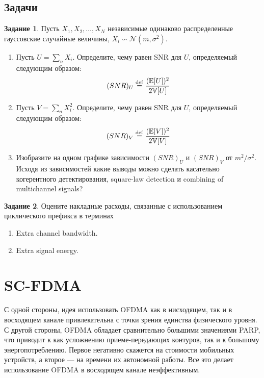 \documentclass{book}
\numberwithin{theorem}{chapter}
\numberwithin{statement}{chapter}
\numberwithin{lemma}{chapter}
\theoremstyle{definition}
\newtheorem{task}{Задание}
\numberwithin{task}{chapter}
\theoremstyle{remark}
\numberwithin{example}{chapter}
\theoremstyle{definition}
\numberwithin{definition}{chapter}
\theoremstyle{remark}
\theoremstyle{remark}
\numberwithin{lyrics}{section}
\begin{document}
\subsection{Задачи}
\begin{task}
Пусть $X_1, X_2, \dots , X_N$ независимые одинаково распределенные гауссовские случайные величины, $X_i \backsim \mathcal{N}(m, \sigma^2)$.
\begin{enumerate}
\item Пусть $U = \sum_n X_i$. Определите, чему равен SNR для $U$, определяемый следующим образом:
$$
(SNR)_U \mathrel{\stackrel{\rm def}=} \frac{(\mathbb{E}[U])^2}{2 \mathbb{V} [U]}
$$
\item Пусть $V = \sum_n X_i^2$. Определите, чему равен SNR для $U$, определяемый следующим образом:
$$
(SNR)_V \mathrel{\stackrel{\rm def}=} \frac{(\mathbb{E}[V])^2}{2 \mathbb{V} [V]}
$$
\item Изобразите на одном графике зависимости $(SNR)_U$ и $(SNR)_V$ от $m^2/\sigma^2$. Исходя из зависимостей какие выводы можно сделать касательно когерентного детектирования, square-law detection и combining of multichannel signals?
\end{enumerate}
\end{task}

\begin{task}
Оцените накладные расходы, связанные с использованием циклического префикса в терминах
\begin{enumerate}
	\item Extra channel bandwidth.
	\item Extra signal energy.
\end{enumerate}
\end{task}

\section{SC-FDMA}
С одной стороны, идея использовать OFDMA как в нисходящем, так и в восходящем канале привлекательна с точки зрения единства физического уровня. С другой стороны, OFDMA обладает сравнительно большими значениями PARP, что приводит к как усложнению приеме-передающих контуров, так и к большому энергопотреблению. Первое негативно скажется на стоимости мобильных устройств, а второе --- на времени их автономной работы. Все это делает использование OFDMA в восходящем канале неэффективным. 
\end{document}
